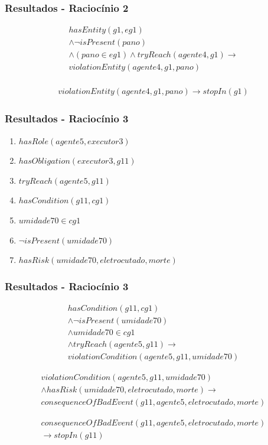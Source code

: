 \documentclass{beamer}
\begin{document}
\begin{frame}
	\frametitle{Resultados - Raciocínio 2}
	\begin{eqnarray}\nonumber
		hasEntity(g1,eg1) \nonumber \\ 
		\wedge \neg isPresent(pano) 	\nonumber \\ 
		\wedge (pano \in eg1) \wedge tryReach(agente4,g1) \to \nonumber \\ 
		violationEntity(agente4,g1,pano) \nonumber \\
	\end{eqnarray}

	\begin{eqnarray}
		violationEntity(agente4,g1,pano) \to stopIn(g1)
	\end{eqnarray}
\end{frame}

\begin{frame}
	\frametitle{Resultados - Raciocínio 3}
	\begin{enumerate}
		\item $hasRole(agente5,executor3)$
		\item $hasObligation(executor3,g11)$	
		\item $tryReach(agente5,g11)$ 
		\item $hasCondition(g11,cg1)$
		\item $umidade70 \in cg1$	
		\item $\neg isPresent(umidade70)$
		\item $hasRisk(umidade70,eletrocutado,morte)$
	\end{enumerate}
\end{frame}

\begin{frame}
	\frametitle{Resultados - Raciocínio 3}
	\begin{eqnarray}
		hasCondition(g11,cg1) \nonumber \\ 
		\wedge \neg isPresent(umidade70) \nonumber \\
		\wedge umidade70 \in cg1 \nonumber \\
		\wedge tryReach(agente5,g11) \to \nonumber \\  
		violationCondition(agente5,g11,umidade70) 
	\end{eqnarray}

	\begin{eqnarray} \nonumber
		violationCondition(agente5,g11,umidade70) \nonumber \\
		\wedge hasRisk(umidade70,eletrocutado,morte) \to \nonumber \\  
		consequenceOfBadEvent(g11,agente5,eletrocutado,morte)
	\end{eqnarray}

	\begin{eqnarray}
		consequenceOfBadEvent(g11,agente5,eletrocutado,morte) \\ \nonumber \to stopIn(g11) \nonumber
	\end{eqnarray}	
\end{frame}
\end{document}
